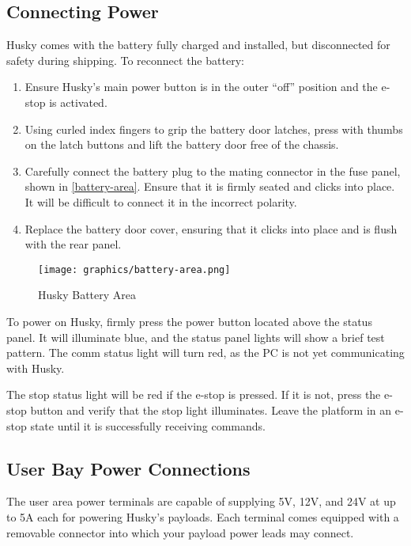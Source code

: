 \documentclass[]{clearpath-latex/clearpath-manual}
\begin{document}
\newpage

\subsection{Connecting Power}
Husky comes with the battery fully charged and installed, but disconnected for safety during shipping.
To reconnect the battery:

\begin{enumerate}
	\item Ensure Husky’s main power button is in the outer “off” position and the e-stop is activated.
	\item Using curled index fingers to grip the battery door latches, press with thumbs on the latch buttons and lift the battery door free of the chassis.
	\item Carefully connect the battery plug to the mating connector in the fuse panel, shown in \autoref{battery-area}. Ensure that it is firmly seated and clicks into place. It will be difficult to connect it in the incorrect polarity.
	\item Replace the battery door cover, ensuring that it clicks into place and is flush with the rear panel.
\end{enumerate}

\begin{figure}[h]
	\centering
	\texttt{[image: graphics/battery-area.png]}
	\caption{Husky Battery Area}
	\label{battery-area}
\end{figure}

To power on Husky, firmly press the power button located above the status panel. It will illuminate blue, and the
status panel lights will show a brief test pattern. The comm status light will turn red, as the PC is not yet
communicating with Husky.

The stop status light will be red if the e-stop is pressed. If it is not, press the e-stop button and
verify that the stop light illuminates. Leave the platform in an e-stop state until it is successfully receiving commands.

\subsection{User Bay Power Connections}
The user area power terminals are capable of supplying 5V, 12V, and 24V at up to 5A each for powering Husky’s payloads.
Each terminal comes equipped with a removable connector into which your payload power leads may connect.
\end{document}

